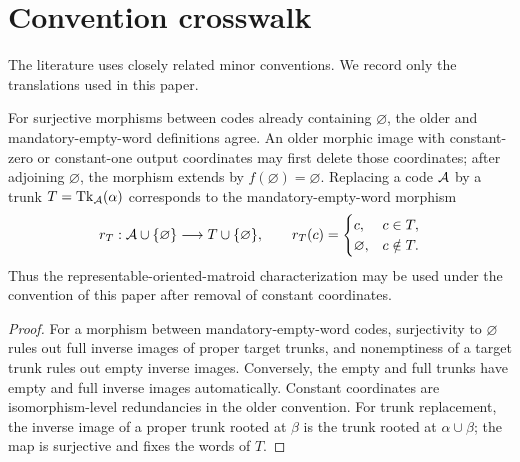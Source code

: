 \section{Convention crosswalk}
\label{app:crosswalk}

The literature uses closely related minor conventions.  We record only the translations used in this paper.

\begin{lemma}
For surjective morphisms between codes already containing $\varnothing$, the older and mandatory-empty-word definitions agree.  An older morphic image with constant-zero or constant-one output coordinates may first delete those coordinates; after adjoining $\varnothing$, the morphism extends by $f(\varnothing)=\varnothing$.  Replacing a code $\mathcal A$ by a trunk $T=\operatorname{Tk}_\mathcal A(\alpha)$ corresponds to the mandatory-empty-word morphism
\[
 r_T:\mathcal A\cup\{\varnothing\}\longrightarrow T\cup\{\varnothing\},
 \qquad
 r_T(c)=
 \begin{cases}
 c,&c\in T,\\
 \varnothing,&c\notin T.
 \end{cases}
\]
Thus the representable-oriented-matroid characterization may be used under the convention of this paper after removal of constant coordinates.
\end{lemma}

\begin{proof}
For a morphism between mandatory-empty-word codes, surjectivity to $\varnothing$ rules out full inverse images of proper target trunks, and nonemptiness of a target trunk rules out empty inverse images.  Conversely, the empty and full trunks have empty and full inverse images automatically.  Constant coordinates are isomorphism-level redundancies in the older convention.  For trunk replacement, the inverse image of a proper trunk rooted at $\beta$ is the trunk rooted at $\alpha\cup\beta$; the map is surjective and fixes the words of $T$.
\end{proof}
